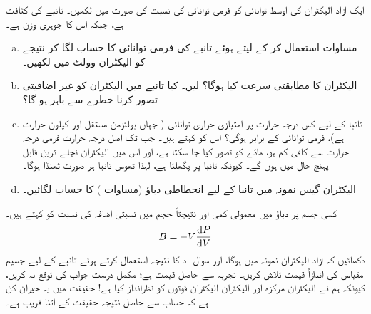 ایک آزاد الیکٹران کی اوسط توانائی  کو فرمی توانائی کی نسبت کی صورت میں لکھیں۔
 
تانبے کی کثافت  ہے، جبکہ اس کا جوہری وزن  ہے۔
\begin{enumerate}[a.]
\item
 مساوات  استعمال کر کے  لیتے ہوئے تانبے کی فرمی توانائی کا حساب لگا کر نتیجے کو الیکٹران وولٹ میں لکھیں۔
\item
 الیکٹران کا مطابقتی سرعت کیا ہوگا؟  لیں۔ کیا تانبے میں الیکٹران کو غیر اضافیتی تصور کرنا خطرے سے باہر ہو گا؟
\item
 تانبا کے لیے کس درجہ حرارت پر امتیازی حراری توانائی (  جہاں  بولٹزمن مستقل اور  کیلون حرارت ہے)، فرمی توانائی کے برابر ہوگی؟ اس کو کہتے ہیں۔ جب تک اصل درجہ حرارت فرمی درجہ حرارت سے کافی کم ہو، مادّے کو  تصور کیا جا سکتا ہے، اور اس میں الیکٹران نچلے ترین قابل پہنچ حال میں ہوں گے۔ کیونکہ تانبا  پر پگھلتا ہے، لہٰذا ٹھوس تانبا ہر صورت ٹھنڈا ہوگا۔
\item 
 الیکٹران گیس نمونہ میں تانبا کے لیے انحطاطی دباؤ (مساوات ) کا حساب لگائیں۔
 \end{enumerate}
کسی جسم پر دباؤ میں معمولی کمی اور نتیجتاً حجم میں نسبتی اضافہ کی نسبت  کو  کہتے ہیں۔
\begin{align*}
	B = -V\frac{\dif P}{\dif V}
\end{align*}
دکھائیں کہ آزاد الیکٹران نمونہ میں ہوگا، اور سوال -د کا نتیجہ استعمال کرتے ہوئے تانبے کے لیے جسیم مقیاس کی اندازاً قیمت تلاش کریں۔  تجربہ سے حاصل قیمت  ہے؛ مکمل درست جواب کی توقع نہ کریں، کیونکہ ہم نے الیکٹران مرکزہ اور الیکٹران الیکٹران قوتوں کو نظرانداز کیا ہے! حقیقت میں یہ حیران کن ہے کہ حساب سے حاصل نتیجہ حقیقت کے اتنا قریب ہے۔ 

